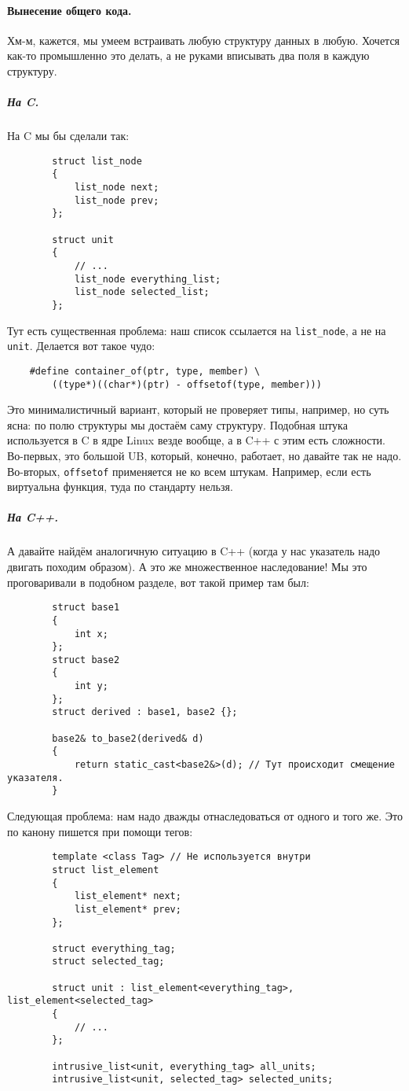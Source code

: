 \documentclass{article}
\begin{document}
    \paragraph{Вынесение общего кода.}
    Хм-м, кажется, мы умеем встраивать любую структуру данных в любую. Хочется как-то промышленно это делать, а не руками вписывать два поля в каждую структуру.
    \subparagraph{На C.}
    На C мы бы сделали так:
    \begin{verbatim}
        struct list_node
        {
            list_node next;
            list_node prev;
        };

        struct unit
        {
            // ...
            list_node everything_list;
            list_node selected_list;
        };
    \end{verbatim}
    Тут есть существенная проблема: наш список ссылается на \texttt{list_node}, а не на \texttt{unit}. Делается вот такое чудо:
    \begin{verbatim}
    #define container_of(ptr, type, member) \
        ((type*)((char*)(ptr) - offsetof(type, member)))
    \end{verbatim}
    Это минималистичный вариант, который не проверяет типы, например, но суть ясна: по полю структуры мы достаём саму структуру. Подобная штука используется в C в ядре Linux везде вообще, а в C++ с этим есть сложности. Во-первых, это большой UB, который, конечно, работает, но давайте так не надо. Во-вторых, \texttt{offsetof} применяется не ко всем штукам. Например, если есть виртуальна функция, туда по стандарту нельзя.
    \subparagraph{На C++.}
    А давайте найдём аналогичную ситуацию в C++ (когда у нас указатель надо двигать походим образом). А это же множественное наследование! Мы это проговаривали в подобном разделе, вот такой пример там был:
    \begin{verbatim}
        struct base1
        {
            int x;
        };
        struct base2
        {
            int y;
        };
        struct derived : base1, base2 {};

        base2& to_base2(derived& d)
        {
            return static_cast<base2&>(d); // Тут происходит смещение указателя.
        }
    \end{verbatim}
    Следующая проблема: нам надо дважды отнаследоваться от одного и того же. Это по канону пишется при помощи тегов:
    \begin{verbatim}
        template <class Tag> // Не используется внутри
        struct list_element
        {
            list_element* next;
            list_element* prev;
        };

        struct everything_tag;
        struct selected_tag;
        
        struct unit : list_element<everything_tag>, list_element<selected_tag>
        {
            // ...
        };

        intrusive_list<unit, everything_tag> all_units;
        intrusive_list<unit, selected_tag> selected_units;
    \end{verbatim}
\end{document}
